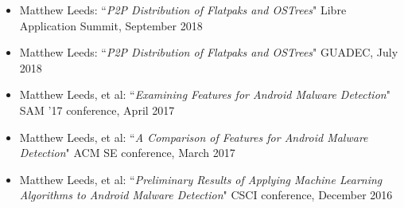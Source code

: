 \documentclass[11pt]{article}
\begin{document}
\begin{itemize}[itemindent=0em]
  \item Matthew Leeds: ``\textit{P2P Distribution of Flatpaks and OSTrees}"\newline
        Libre Application Summit, September 2018
  \item Matthew Leeds: ``\textit{P2P Distribution of Flatpaks and OSTrees}"\newline
        GUADEC, July 2018
  \item Matthew Leeds, et al: ``\textit{Examining Features for Android Malware Detection}"\newline
        SAM '17 conference, April 2017
  \item Matthew Leeds, et al: ``\textit{A Comparison of Features for Android Malware Detection}"\newline
        ACM SE conference, March 2017
  \item Matthew Leeds, et al: ``\textit{Preliminary Results of Applying Machine Learning Algorithms to Android Malware Detection}"\newline
        CSCI conference, December 2016
\end{itemize}
\end{document}
